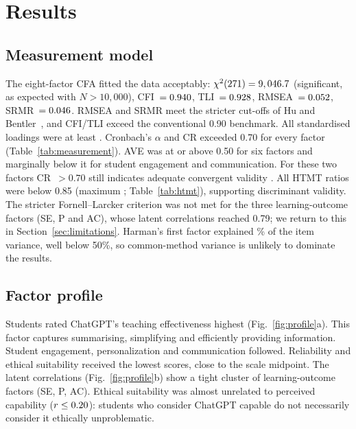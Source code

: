 \documentclass[fleqn,10pt]{wlscirep}
\theoremstyle{remark}
\begin{document}
\section{Results}
\label{sec:results}

\subsection{Measurement model}
The eight-factor CFA fitted the data acceptably: $\chi^2(271)=9,046.7$ (significant, as expected with $N>10{,}000$), CFI~$=0.940$, TLI~$=0.928$, RMSEA~$=0.052$, SRMR~$=0.046$. RMSEA and SRMR meet the stricter cut-offs of Hu and Bentler~\cite{hu1999}, and CFI/TLI exceed the conventional 0.90 benchmark. All standardised loadings were at least \LoadMin. Cronbach's $\alpha$ and CR exceeded 0.70 for every factor (Table~\ref{tab:measurement}). AVE was at or above 0.50 for six factors and marginally below it for student engagement and communication. For these two factors CR~$>0.70$ still indicates adequate convergent validity \cite{fornell1981}. All HTMT ratios were below 0.85 (maximum \HTMTmax; Table~\ref{tab:htmt}), supporting discriminant validity. The stricter Fornell--Larcker criterion was not met for the three learning-outcome factors (SE, P and AC), whose latent correlations reached 0.79; we return to this in Section~\ref{sec:limitations}. Harman's first factor explained \Harman\% of the item variance, well below 50\%, so common-method variance is unlikely to dominate the results.




\subsection{Factor profile}
Students rated ChatGPT's teaching effectiveness highest (Fig.~\ref{fig:profile}a). This factor captures summarising, simplifying and efficiently providing information. Student engagement, personalization and communication followed. Reliability and ethical suitability received the lowest scores, close to the scale midpoint. The latent correlations (Fig.~\ref{fig:profile}b) show a tight cluster of learning-outcome factors (SE, P, AC). Ethical suitability was almost unrelated to perceived capability ($r\le0.20$): students who consider ChatGPT capable do not necessarily consider it ethically unproblematic.
\end{document}
